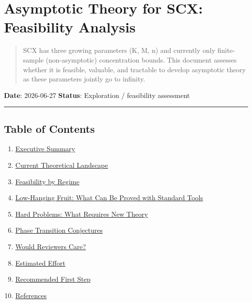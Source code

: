 \documentclass[
  12pt,
]{ctexart}
\author{SCX}
\date{2026}
\providecommand{\tightlist}{%
  \setlength{\itemsep}{0pt}\setlength{\parskip}{0pt}}
\begin{document}
\section{Asymptotic Theory for SCX: Feasibility
Analysis}\label{asymptotic-theory-for-scx-feasibility-analysis}

\begin{quote}
SCX has three growing parameters (K, M, n) and currently only
finite-sample (non-asymptotic) concentration bounds. This document
assesses whether it is feasible, valuable, and tractable to develop
asymptotic theory as these parameters jointly go to infinity.
\end{quote}

\textbf{Date}: 2026-06-27 \textbf{Status}: Exploration / feasibility
assessment

\begin{center}\rule{0.5\linewidth}{0.5pt}\end{center}

\subsection{Table of Contents}\label{table-of-contents}

\begin{enumerate}
\def\labelenumi{\arabic{enumi}.}
\tightlist
\item
  \hyperref[1-executive-summary]{Executive Summary}
\item
  \hyperref[2-current-theoretical-landscape]{Current Theoretical
  Landscape}
\item
  \hyperref[3-feasibility-by-regime]{Feasibility by Regime}
\item
  \hyperref[4-low-hanging-fruit-what-can-be-proved-with-standard-tools]{Low-Hanging
  Fruit: What Can Be Proved with Standard Tools}
\item
  \hyperref[5-hard-problems-what-requires-new-theory]{Hard Problems:
  What Requires New Theory}
\item
  \hyperref[6-phase-transition-conjectures]{Phase Transition
  Conjectures}
\item
  \hyperref[7-would-reviewers-care]{Would Reviewers Care?}
\item
  \hyperref[8-estimated-effort]{Estimated Effort}
\item
  \hyperref[9-recommended-first-step]{Recommended First Step}
\item
  \hyperref[10-references]{References}
\end{enumerate}
\end{document}

